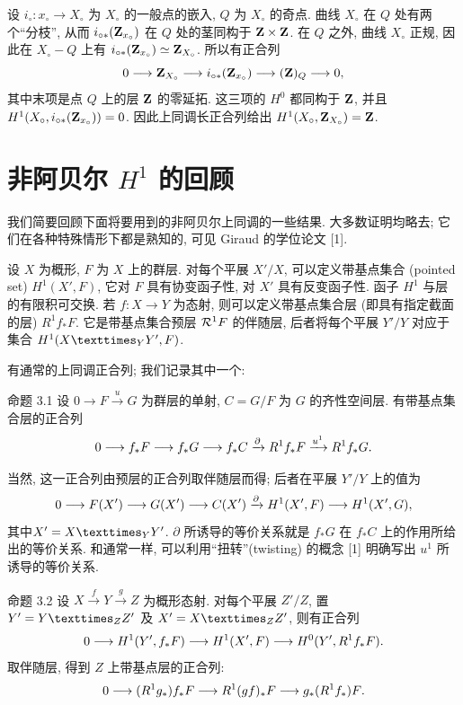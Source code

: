 设 $i_\circ:x_\circ\to X_\circ$ 为 $X_\circ$ 的一般点的嵌入, $Q$ 为 $X_\circ$ 的奇点. 曲线 $X_\circ$ 在 $Q$ 处有两个“分枝”, 从而 $i_{\circ*}(\mathbf{Z}_{x_\circ})$ 在 $Q$ 处的茎同构于 $\mathbf{Z}\times\mathbf{Z}$. 在 $Q$ 之外, 曲线 $X_\circ$ 正规, 因此在 $X_\circ-Q$ 上有 $i_{\circ*}(\mathbf{Z}_{x_\circ})\simeq\mathbf{Z}_{X_\circ}$. 所以有正合列
$$
0\longrightarrow\mathbf{Z}_{X_\circ}\longrightarrow
i_{\circ*}(\mathbf{Z}_{x_\circ})\longrightarrow(\mathbf{Z})_Q
\longrightarrow0{},
$$
其中末项是点 $Q$ 上的层 $\mathbf{Z}$ 的零延拓. 这三项的 $H^0$ 都同构于 $\mathbf{Z}$, 并且\linebreak $H^1(X_\circ,i_{\circ*}(\mathbf{Z}_{x_\circ}))=0$. 因此上同调长正合列给出 $H^1(X_\circ,\mathbf{Z}_{X_\circ})=\mathbf{Z}$\pageoriginale.

\section{非阿贝尔 $H^1$ 的回顾}

我们简要回顾下面将要用到的非阿贝尔上同调的一些结果. 大多数证明均略去; 它们在各种特殊情形下都是熟知的, 可见 Giraud 的学位论文 [1].

设 $X$ 为概形, $F$ 为 $X$ 上的群层. 对每个平展 $X'/X$, 可以定义带基点集合 (pointed set) $H^1(X',F)$, 它对 $F$ 具有协变函子性, 对 $X'$ 具有反变函子性. 函子 $H^1$ 与层的有限积可交换. 若 $f:X\to Y$ 为态射, 则可以定义带基点集合层 (即具有指定截面的层) $R^1f_*F$. 它是带基点集合预层 ${\mathcal R}^1F$ 的伴随层, 后者将每个平展 $Y'/Y$ 对应于集合 $H^1(\fprod{X}{Y'}{Y},F)$.

有通常的上同调正合列; 我们记录其中一个:

\begin{enonce*}{命题 3.1}
设 $0\to F\xrightarrow{u}G$ 为群层的单射, $C=G/F$ 为 $G$ 的齐性空间层. 有带基点集合层的正合列
$$
0\to f_*F\to f_*G\to f_*C\xrightarrow{\partial}
R^1f_*F\xrightarrow{u^1}R^1f_*G{\quoi}.
$$
\end{enonce*}

当然, 这一正合列由预层的正合列取伴随层而得; 后者在平展 $Y'/Y$ 上的值为
$$
0\to F(X')\to G(X')\to C(X')\xrightarrow{\partial}
H^1(X',F)\to H^1(X',G){\quoi},
$$
其中\pageoriginale $X'=\fprod{X}{Y'}{Y}$. $\partial$ 所诱导的等价关系就是 $f_*G$ 在 $f_*C$ 上的作用所给出的等价关系. 和通常一样, 可以利用“扭转”(twisting) 的概念 [1] 明确写出 $u^1$ 所诱导的等价关系.

\begin{enonce*}{命题 3.2}
设 $X\xrightarrow{f}Y\xrightarrow{g}Z$ 为概形态射. 对每个平展 $Z'/Z$, 置 $Y'=\fprod{Y}{Z'}{Z}$ 及 $X'=\fprod{X}{Z'}{Z}$, 则有正合列
$$
0\longrightarrow H^1(Y',f_*F)\longrightarrow H^1(X',F)
\longrightarrow H^0(Y',R^1f_*F){}.
$$
取伴随层, 得到 $Z$ 上带基点层的正合列:
$$
0\longrightarrow (R^1g_*)f_*F\longrightarrow R^1(gf)_*F
\longrightarrow g_*(R^1f_*)F{}.
$$
\end{enonce*}

